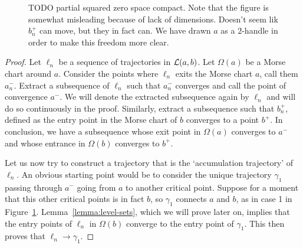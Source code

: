 \begin{figure}[H]
    \centering
    \caption{TODO partial squared zero space compact.
        Note that the figure is somewhat misleading because of lack of dimensions.
        Doesn't seem lik $b_n^{+}$ can move, but they in fact can.
        We have drawn $a$ as a $2$-handle in order to make this freedom more clear.
    }
    \label{fig:partial-squared-zero-space-compact}
\end{figure}
\begin{proof}
    Let $ \ell_n$ be a sequence of trajectories in $\mathcal L(a, b)$.
    Let $\Omega(a)$ be a Morse chart around $a$.
    Consider the points where $\ell_n$ exits the Morse chart $a$, call them $a_n^{-}$.
    Extract a subsequence of $\ell_n$ such that $a_{n}^{-}$ converges and call the point of convergence $a^{-}$.
    We will denote the extracted subsequence again by $\ell_n$ and will do so continuously in the proof.
    Similarly, extract a subsequence such that $b_n^{+}$, defined as the entry point in the Morse chart of $b$ converges to a point $b^{+}$.
    In conclusion, we have a subsequence whose exit point in $\Omega(a)$  converges to $a^{-}$ and whose entrance in $\Omega(b)$ converges to  $b^{+}$.

    Let us now try to construct a trajectory that is the `accumulation trajectory' of $\ell_n$.
    An obvious starting point would be to consider the unique trajectory $\gamma_1$ passing through $a^{-}$ going from $a$ to another critical point.
    Suppose for a moment that this other critical points is in fact $b$, so $\gamma_1$ connects  $a$ and  $b$, as in case 1 in Figure~\ref{fig:partial-squared-zero-space-compact}.
    Lemma~\ref{lemma:level-sets}, which we will prove later on, implies that the entry points of $\ell_n$ in $\Omega(b)$ converge to the entry point of $\gamma_1$. This then proves that $\ell_n \to  \gamma_1$.


\end{proof}
